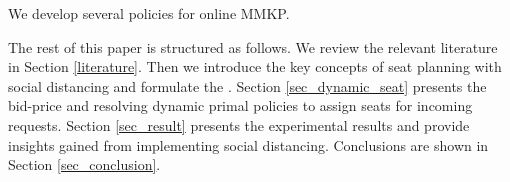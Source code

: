 

We develop several policies for online MMKP. 

The rest of this paper is structured as follows. We review the relevant literature in Section \ref{literature}. Then we introduce the key concepts of seat planning with social distancing and formulate the . Section \ref{sec_dynamic_seat} presents the bid-price and resolving dynamic primal policies to assign seats for incoming requests. Section \ref{sec_result} presents the experimental results and provide insights gained from implementing social distancing. Conclusions are shown in Section \ref{sec_conclusion}.